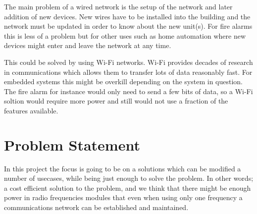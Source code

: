 The main problem of a wired network is the setup of the network and later addition of new devices. 
New wires have to be installed into the building and the network must be updated in order to know about the new unit(s).
For fire alarms this is less of a problem but for other uses such as home automation where new devices might enter and leave the network at any time.

This could be solved by using Wi-Fi networks.
Wi-Fi provides decades of research in communications which allows them to transfer lots of data reasonably fast.
For embedded systems this might be overkill depending on the system in question.
The fire alarm for instance would only need to send a few bits of data, so a Wi-Fi soltion would require more power and still would not use a fraction of the features available.






\section{Problem Statement}\label{sec:problemStatement}

In this project the focus is going to be on a solutions which can be modified a number of usecases, while being just enough to solve the problem.
In other words; a cost efficient solution to the problem, and we think that there might be enough power in radio frequencies modules that even when using only one frequency a communications network can be established and maintained.

